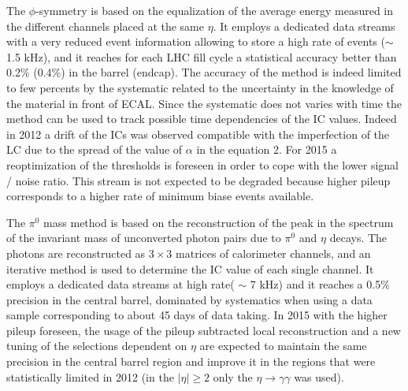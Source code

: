 \documentclass[journal]{IEEEtran}
\begin{document}
The $\phi$-symmetry is based on the equalization of the average energy measured in the different channels placed at the same $\eta$. It employs a dedicated data streams with a very reduced event information allowing to store a high rate of events ($\sim$ 1.5 kHz), and it reaches for each LHC fill cycle a statistical accuracy better than 0.2\% (0.4\%) in the barrel (endcap). The accuracy of the method is indeed limited to few percents by the systematic related to the uncertainty in the knowledge of the material in front of ECAL. Since the systematic does not varies with time the method can be used to track possible time dependencies of the IC values. Indeed in 2012 a drift of the ICs was observed compatible with the imperfection of the LC due to the spread of the value of $\alpha$ in the equation 2. For 2015 a reoptimization of the thresholds is foreseen in order to cope with the lower signal / noise ratio. This stream is not expected to be degraded because higher pileup corresponds to a higher rate of minimum biase events available.

The $\pi^0$ mass method is based on the reconstruction of the peak in the spectrum of the invariant mass of unconverted photon pairs due to $\pi^0$ and $\eta$ decays. The photons are reconstructed as $3 \times 3$ matrices of calorimeter channels, and an iterative method is used to determine the IC value of each single channel. It employs a dedicated data streams at high rate( $\sim$ 7 kHz) and it reaches a 0.5\% precision in the central barrel, dominated by systematics when using a data sample corresponding to about 45 days of data taking. In 2015 with the higher pileup foreseen, the usage of the pileup subtracted local reconstruction and a new tuning of the selections dependent on $\eta$ are expected to maintain the same precision in the central barrel region and improve it in the regions that were statistically limited in 2012 (in the $\vert\eta\vert\ge2$ only the $\eta\to\gamma\gamma$ was used).
\end{document}
